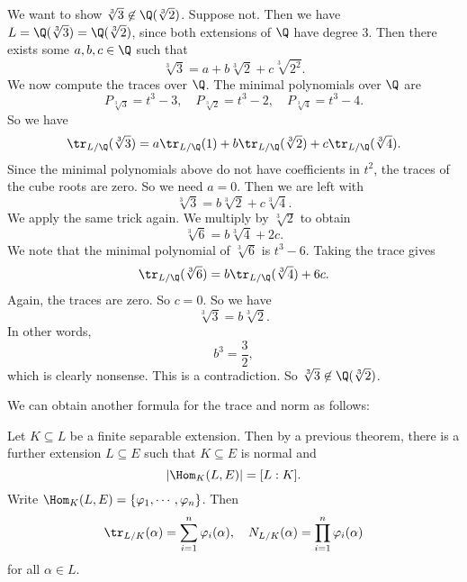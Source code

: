 \documentclass[a4paper]{article}
\begin{document}
\begin{eg}
  We want to show $\sqrt[3]{3} \not\in \Q(\sqrt[3]{2})$. Suppose not. Then we have $L = \Q(\sqrt[3]{3}) = \Q(\sqrt[3]{2})$, since both extensions of $\Q$ have degree $3$. Then there exists some $a, b, c \in \Q$ such that
  \[
    \sqrt[3]{3} = a + b\sqrt[3]{2} + c \sqrt[3]{2^2}.
  \]
  We now compute the traces over $\Q$. The minimal polynomials over $\Q$ are
  \[
    P_{\sqrt[3]{3}} = t^3 - 3,\quad P_{\sqrt[3]{2}} = t^3 - 2,\quad P_{\sqrt[3]{4}} = t^3 - 4.
  \]
  So we have
  \[
    \tr_{L/\Q}(\sqrt[3]{3}) = a \tr_{L/\Q}(1) + b \tr_{L/\Q}(\sqrt[3]{2}) + c\tr_{L/\Q}(\sqrt[3]{4}).
  \]
  Since the minimal polynomials above do not have coefficients in $t^2$, the traces of the cube roots are zero. So we need $a = 0$. Then we are left with
  \[
    \sqrt[3]{3} = b\sqrt[3]{2} + c\sqrt[3]{4}.
  \]
  We apply the same trick again. We multiply by $\sqrt[3]{2}$ to obtain
  \[
    \sqrt[3]{6} = b\sqrt[3]{4} + 2c.
  \]
  We note that the minimal polynomial of $\sqrt[3]{6}$ is $t^3 - 6$. Taking the trace gives
  \[
    \tr_{L/\Q}(\sqrt[3]{6}) = b \tr_{L/\Q}(\sqrt[3]{4}) + 6c.
  \]
  Again, the traces are zero. So $c = 0$. So we have
  \[
    \sqrt[3]{3} = b \sqrt[3]{2}.
  \]
  In other words,
  \[
    b^3 = \frac{3}{2},
  \]
  which is clearly nonsense. This is a contradiction. So $\sqrt[3]{3} \not\in \Q(\sqrt[3]{2})$.
\end{eg}

We can obtain another formula for the trace and norm as follows:
\begin{thm}
  Let $K \subseteq L$ be a finite separable extension. Then by a previous theorem, there is a further extension $L \subseteq E$ such that $K \subseteq E$ is normal and
  \[
    |\Hom_K(L, E)| = [L:K].
  \]
  Write $\Hom_K(L, E) = \{\varphi_1, \cdots, \varphi_n\}$. Then
  \[
    \tr_{L/K} (\alpha) = \sum_{i = 1}^n \varphi_i(\alpha),\quad N_{L/K}(\alpha) = \prod_{i = 1}^n \varphi_i(\alpha)
  \]
  for all $\alpha \in L$.
\end{thm}
\end{document}
